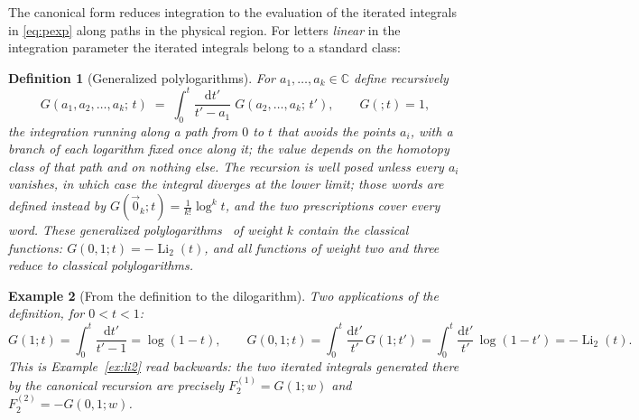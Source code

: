\documentclass[11pt]{article}
\newcommand{\dd}{\mathrm{d}}
\newtheorem{definition}{Definition}[section]
\newtheorem{example}[definition]{Example}
\begin{document}
The canonical form reduces integration to the evaluation of the
iterated integrals in \eqref{eq:pexp} along paths in the physical
region.  For letters \emph{linear} in the integration parameter the
iterated integrals belong to a standard class:

\begin{definition}[Generalized polylogarithms]
For $a_1,\dots,a_k \in \mathbb{C}$ define recursively
\begin{equation}
  G(a_1,a_2,\dots,a_k;\,t) \;=\;
  \int_0^{t}\frac{\dd t'}{t' - a_1}\;
  G(a_2,\dots,a_k;\,t') ,
  \qquad G(;t) = 1 ,
  \label{eq:gpl}
\end{equation}
the integration running along a path from $0$ to $t$ that avoids the
points $a_i$, with a branch of each logarithm fixed once along it; the
value depends on the homotopy class of that path and on nothing else.
The recursion is well posed unless every $a_i$ vanishes, in which case
the integral diverges at the lower limit; those words are defined
instead by $G(\vec 0_k; t) = \tfrac{1}{k!}\log^k t$, and the two
prescriptions cover every word.  These \emph{generalized
polylogarithms}~\cite{goncharov} of weight $k$ contain the classical
functions: $G(0,1;t) = -\operatorname{Li}_2(t)$, and all functions of
weight two and three reduce to classical polylogarithms.
\end{definition}

\begin{example}[From the definition to the dilogarithm]
Two applications of the definition, for $0 < t < 1$:
\begin{equation}
  G(1;t) = \int_0^t \frac{\dd t'}{t'-1} = \log(1-t),
  \qquad
  G(0,1;t) = \int_0^t \frac{\dd t'}{t'}\,G(1;t')
           = \int_0^t \frac{\dd t'}{t'}\,\log(1-t')
           = -\operatorname{Li}_2(t) .
\end{equation}
This is Example~\ref{ex:li2} read backwards: the two iterated
integrals generated there by the canonical recursion are precisely
$F_2^{(1)} = G(1;w)$ and $F_2^{(2)} = -G(0,1;w)$.
\end{example}
\end{document}
